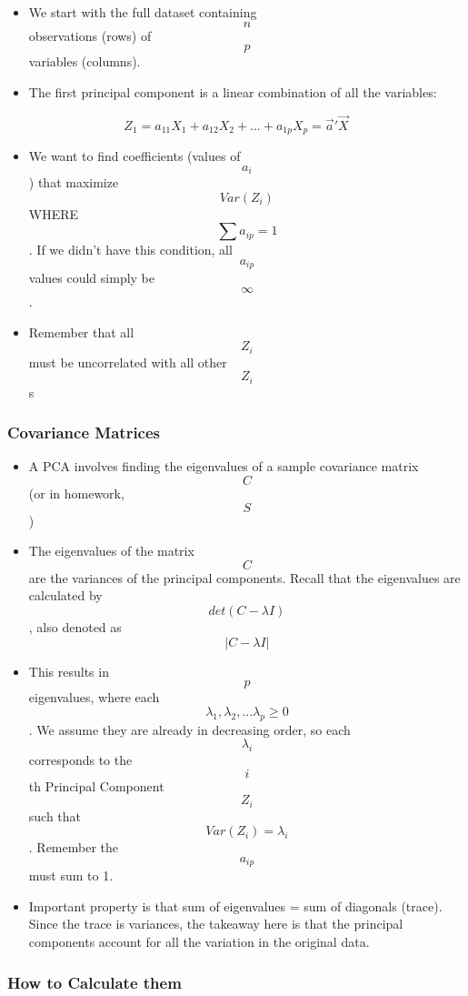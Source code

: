 \begin{itemize}
\tightlist
\item
  We start with the full dataset containing \[n\] observations (rows) of
  \[p\] variables (columns).
\item
  The first principal component is a linear combination of all the
  variables:
\end{itemize}

\[Z_1 = a_{11}X_1 + a_{12}X_2 + ... + a_{1p}X_p = \vec{a}'\vec{X}\]

\begin{itemize}
\tightlist
\item
  We want to find coefficients (values of \[a_i\]) that maximize
  \[Var(Z_i)\] WHERE \[\sum{a_{ip}} = 1\]. If we didn't have this
  condition, all \[a_{ip}\] values could simply be \[\infty\].
\item
  Remember that all \[Z_i\] must be uncorrelated with all other \[Z_i\]s
\end{itemize}

\hypertarget{covariance-matrices}{%
\subsubsection{Covariance Matrices}\label{covariance-matrices}}

\begin{itemize}
\tightlist
\item
  A PCA involves finding the eigenvalues of a sample covariance matrix
  \[C\] (or in homework, \[S\])
\item
  The eigenvalues of the matrix \[C\] are the variances of the principal
  components. Recall that the eigenvalues are calculated by
  \[det(C - \lambda I)\], also denoted as \[| C - \lambda I |\]
\item
  This results in \[p\] eigenvalues, where each
  \[\lambda_1, \lambda_2, ...\lambda_p \ge 0\]. We assume they are
  already in decreasing order, so each \[\lambda_i\] corresponds to the
  \[i\]th Principal Component \[Z_i\] such that
  \[Var(Z_i) = \lambda_i\]. Remember the \[a_{ip}\] must sum to 1.
\item
  Important property is that sum of eigenvalues = sum of diagonals
  (trace). Since the trace is variances, the takeaway here is that the
  principal components account for all the variation in the original
  data.
\end{itemize}

\hypertarget{how-to-calculate-them}{%
\subsubsection{How to Calculate them}\label{how-to-calculate-them}}

